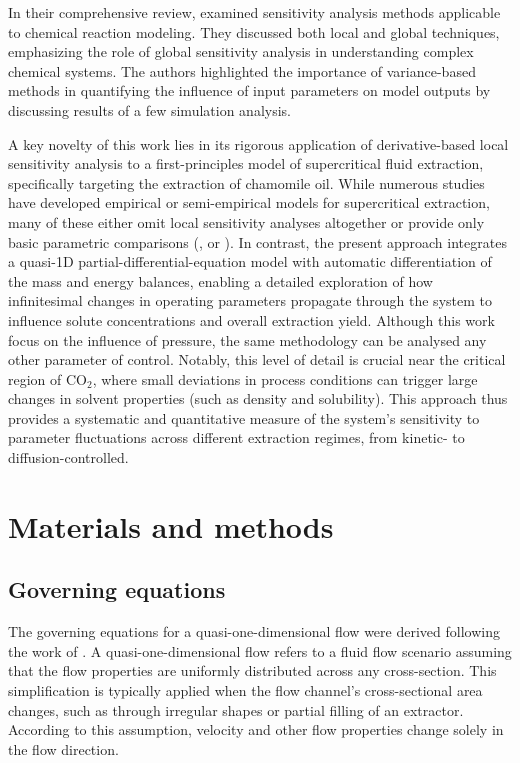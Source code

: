 \documentclass[a4paper,fleqn]{cas-dc}
\begin{document}
	In their comprehensive review, \citet{Saltelli2005} examined sensitivity analysis methods applicable to chemical reaction modeling. They discussed both local and global techniques, emphasizing the role of global sensitivity analysis in understanding complex chemical systems. The authors highlighted the importance of variance-based methods in quantifying the influence of input parameters on model outputs by discussing results of a few simulation analysis.
	
	{\color{blue}A key novelty of this work lies in its rigorous application of derivative-based local sensitivity analysis to a first-principles model of supercritical fluid extraction, specifically targeting the extraction of chamomile oil. While numerous studies have developed empirical or semi-empirical models for supercritical extraction, many of these either omit local sensitivity analyses altogether or provide only basic parametric comparisons (\citet{Santos2000}, \citet{Fiori_2007} or \citet{Zahedi2010}). In contrast, the present approach integrates a quasi-1D partial-differential-equation model with automatic differentiation of the mass and energy balances, enabling a detailed exploration of how infinitesimal changes in operating parameters propagate through the system to influence solute concentrations and overall extraction yield. Although this work focus on the influence of pressure, the same methodology can be analysed any other parameter of control. Notably, this level of detail is crucial near the critical region of CO$_2$, where small deviations in process conditions can trigger large changes in solvent properties (such as density and solubility). This approach thus provides a systematic and quantitative measure of the system’s sensitivity to parameter fluctuations across different extraction regimes, from kinetic- to diffusion-controlled.}
	
	
	\section{Materials and methods} \label{CH: Materials and methods}
	
	\subsection{Governing equations} \label{CH:Governing_equations_chapter}
	The governing equations for a quasi-one-dimensional flow were derived following the work of \citet{Anderson1995}. A quasi-one-dimensional flow refers to a fluid flow scenario assuming that the flow properties are uniformly distributed across any cross-section. This simplification is typically applied when the flow channel's cross-sectional area changes, such as through irregular shapes or partial filling of an extractor. According to this assumption, velocity and other flow properties change solely in the flow direction.
	
\end{document}
